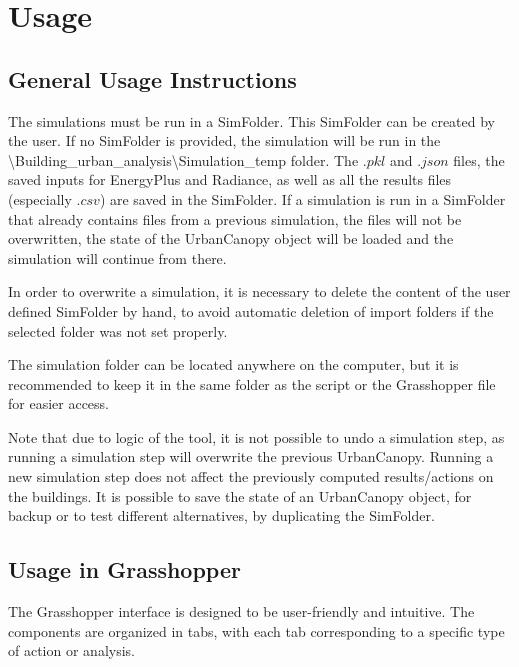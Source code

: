 \documentclass[a4paper,12pt]{article} %
\begin{document}
\section{Usage}
\label{sec:usage}

    \subsection{General Usage Instructions}
    \label{subsec:general-usage-instructions}
    The simulations must be run in a \gls{SimFolder}.
    This \gls{SimFolder} can be created by the user.
    If no \gls{SimFolder} is provided, the simulation will be run in the \textbackslash Building\_urban\_analysis\textbackslash Simulation\_temp folder.
    The $.pkl$ and $.json$ files, the saved inputs for EnergyPlus and Radiance, as well as all the results files (especially $.csv$) are saved in the \gls{SimFolder}.
    If a simulation is run in a \gls{SimFolder} that already contains files from a previous simulation, the files will not be overwritten, the state of the \gls{UrbanCanopy} object will be loaded and the simulation will continue from there.

    In order to overwrite a simulation, it is necessary to delete the content of the user defined \gls{SimFolder} by hand, to avoid automatic deletion of import folders if the selected folder was not set properly.

    The simulation folder can be located anywhere on the computer, but it is recommended to keep it in the same folder as the script or the Grasshopper file for easier access.

    Note that due to logic of the tool, it is not possible to undo a simulation step, as running a simulation step will overwrite the previous \gls{UrbanCanopy}.
    Running a new simulation step does not affect the previously computed results/actions on the buildings.
    It is possible to save the state of an \gls{UrbanCanopy} object, for backup or to test different alternatives, by duplicating the \gls{SimFolder}.

    \subsection{Usage in Grasshopper}
    \label{subsec:usage-in-grasshopper}

    The Grasshopper interface is designed to be user-friendly and intuitive.
    The components are organized in tabs, with each tab corresponding to a specific type of action or analysis.
\end{document}
